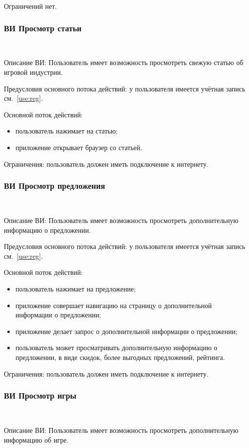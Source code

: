 Ограничений нет.

\subsubsection{ВИ Просмотр статьи}~\par
\label{use:join}
Описание ВИ: Пользователь имеет возможность просмотреть свежую статью об игровой индустрии.
 
Предусловия основного потока действий: у пользователя имеется учётная запись см.~\ref{use:reg}.
 
Основной поток действий:
\begin{itemize}
   \item пользователь нажимает на статью;
   \item приложение открывает браузер со статьей.
\end{itemize}
 
Ограничения: пользователь должен иметь подключение к интернету.
 
\subsubsection{ВИ Просмотр предложения}~\par
Описание ВИ: Пользователь имеет возможность просмотреть дополнительную информацию о предложении.
 
Предусловия основного потока действий: у пользователя имеется учётная запись см.~\ref{use:reg}.

Основной поток действий:
\begin{itemize}
   \item пользователь нажимает на предложение;
   \item приложение совершает навигацию на страницу о дополнительной информации о предложении;
   \item приложение делает запрос о дополнительной информации о предложении;
   \item пользователь может просматривать дополнительную информацию о предложении, в виде скидок, более выгодных предложений, рейтинга.
\end{itemize}
 
Ограничения: пользователь должен иметь подключение к интернету.
 
\subsubsection{ВИ Просмотр игры}~\par
Описание ВИ: Пользователь имеет возможность просмотреть дополнительную информацию об игре.
 
